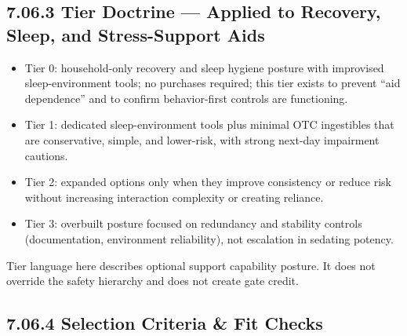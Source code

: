 \documentclass[10pt]{article}
\begin{document}
\subsection*{7.06.3 Tier Doctrine — Applied to Recovery, Sleep, and Stress-Support Aids}
{}

\begin{itemize}
\item Tier 0: household-only recovery and sleep hygiene posture with improvised sleep-environment tools; no purchases required; this tier exists to prevent “aid dependence” and to confirm behavior-first controls are functioning.
\item Tier 1: dedicated sleep-environment tools plus minimal OTC ingestibles that are conservative, simple, and lower-risk, with strong next-day impairment cautions.
\item Tier 2: expanded options only when they improve consistency or reduce risk without increasing interaction complexity or creating reliance.
\item Tier 3: overbuilt posture focused on redundancy and stability controls (documentation, environment reliability), not escalation in sedating potency.
\end{itemize}

Tier language here describes optional support capability posture. It does not override the safety hierarchy and does not create gate credit.

\subsection*{7.06.4 Selection Criteria \& Fit Checks}
{}
\end{document}
